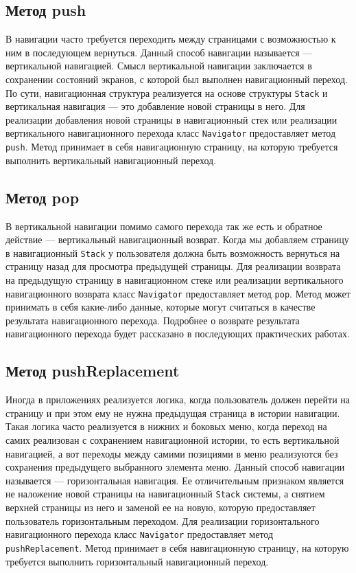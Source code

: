 \subsection{Метод push}

В навигации часто требуется переходить между страницами
с возможностью к ним в последующем вернуться.
Данный способ навигации называется --- вертикальной навигацией.
Смысл вертикальной навигации заключается в сохранении состояний экранов,
с которой был выполнен навигационный переход.
По сути, навигационная структура реализуется
на основе структуры \texttt{Stack} 
и вертикальная навигация --- это добавление новой страницы в него.
Для реализации добавления новой страницы в навигационный стек
или реализации вертикального навигационного перехода класс
\texttt{Navigator} предоставляет метод \texttt{push}.
Метод принимает в себя навигационную страницу,
на которую требуется выполнить вертикальный навигационный переход.

\subsection{Метод pop}

В вертикальной навигации помимо самого перехода так же есть
и обратное действие --- вертикальный навигационный возврат.
Когда мы добавляем страницу в навигационный \texttt{Stack} 
у пользователя должна быть возможность вернуться на страницу назад
для просмотра предыдущей страницы.
Для реализации возврата на предыдущую страницу в навигационном стеке
или реализации вертикального навигационного возврата класс \texttt{Navigator} 
предоставляет метод \texttt{pop}.
Метод может принимать в себя какие-либо данные,
которые могут считаться в качестве результата навигационного перехода.
Подробнее о возврате результата навигационного перехода будет рассказано
в последующих практических работах.

\subsection{Метод pushReplacement}

Иногда в приложениях реализуется логика,
когда пользователь должен перейти на страницу
и при этом ему не нужна предыдущая страница в истории навигации.
Такая логика часто реализуется в нижних и боковых меню,
когда переход на самих реализован с сохранением навигационной истории,
то есть вертикальной навигацией,
а вот переходы между самими позициями в меню реализуются
без сохранения предыдущего выбранного элемента меню.
Данный способ навигации называется --- горизонтальная навигация.
Ее отличительным признаком является не наложение новой страницы
на навигационный \texttt{Stack} системы,
а снятием верхней страницы из него и заменой ее на новую,
которую предоставляет пользователь горизонтальным переходом.
Для реализации горизонтального навигационного перехода
класс \texttt{Navigator} предоставляет метод \texttt{pushReplacement}.
Метод принимает в себя навигационную страницу,
на которую требуется выполнить горизонтальный навигационный переход.

